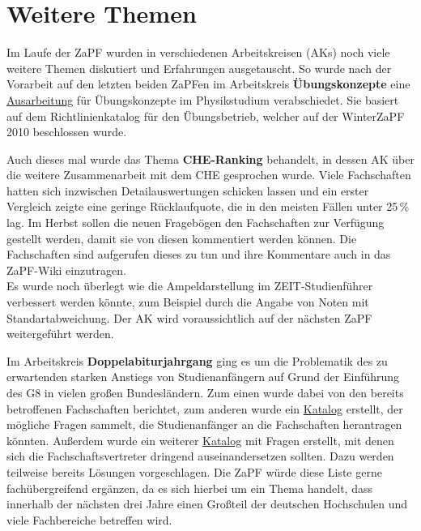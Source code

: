 \documentclass{scrartcl}
\begin{document}
\section*{Weitere Themen}
Im Laufe der ZaPF wurden in verschiedenen Arbeitskreisen (AKs) noch viele weitere Themen diskutiert und Erfahrungen
ausgetauscht. So wurde nach der Vorarbeit auf den letzten beiden ZaPFen im Arbeitskreis \textbf{Übungskonzepte}
eine \href{http://zapfev.de/sites/default/files/2011_05_Ausarbeitung_\%C3\%9Cbungskonzepte.pdf}{Ausarbeitung} für
Übungskonzepte im Physikstudium verabschiedet.
Sie basiert auf dem Richtlinienkatalog für den Übungsbetrieb, welcher auf der WinterZaPF 2010 beschlossen wurde.

Auch dieses mal wurde das Thema \textbf{CHE-Ranking} behandelt, in dessen AK über die weitere Zusammenarbeit mit dem CHE
gesprochen wurde. Viele Fachschaften hatten sich inzwischen Detailauswertungen schicken lassen und ein erster Vergleich
zeigte
eine geringe Rücklaufquote, die in den meisten Fällen unter 25\,\% lag. Im Herbst sollen die neuen Fragebögen den
Fachschaften zur Verfügung gestellt werden, damit sie von diesen kommentiert werden können. Die Fachschaften sind
aufgerufen dieses zu tun und ihre Kommentare auch in das ZaPF-Wiki einzutragen.\\
Es wurde noch überlegt wie die Ampeldarstellung im ZEIT-Studienführer verbessert werden könnte, zum Beispiel durch die
Angabe von Noten mit Standartabweichung. Der AK wird voraussichtlich auf der nächsten ZaPF weitergeführt werden.

Im Arbeitskreis \textbf{Doppelabiturjahrgang} ging es um die Problematik des zu erwartenden starken Anstiegs von
Studienanfängern auf Grund der Einführung des G8 in vielen großen Bundesländern. Zum einen wurde dabei von den bereits
betroffenen Fachschaften berichtet, zum anderen wurde ein
\href{https://vmp.ethz.ch/zapfwiki/index.php/AK_Doppeljahrgang}{Katalog} erstellt, der mögliche Fragen sammelt, die
Studienanfänger an die Fachschaften herantragen könnten. Außerdem wurde ein weiterer
\href{https://vmp.ethz.ch/zapfwiki/index.php/AK_Doppeljahrgang}{Katalog} mit Fragen erstellt, mit denen sich die
Fachschaftsvertreter dringend auseinandersetzen sollten. Dazu werden teilweise bereits Lösungen vorgeschlagen. Die ZaPF
würde diese Liste gerne fachübergreifend ergänzen, da es sich hierbei um ein Thema handelt, dass innerhalb der nächsten
drei Jahre einen Großteil der deutschen Hochschulen und viele Fachbereiche betreffen wird.


\end{document}
